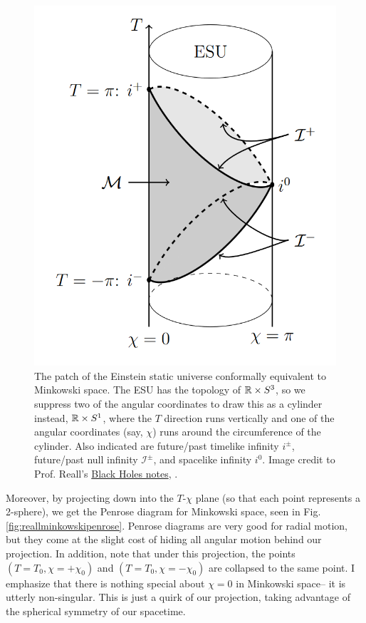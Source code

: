 \begin{figure}
    \centering
    \includegraphics{2019/02/20190222_reallesudiagram.png}
    \caption{The patch of the Einstein static universe conformally equivalent to Minkowski space. The ESU has the topology of $\mathbb{R}\times S^3$, so we suppress two of the angular coordinates to draw this as a cylinder instead, $\mathbb{R}\times S^1$, where the $T$ direction runs vertically and one of the angular coordinates (say, $\chi$) runs around the circumference of the cylinder. Also indicated are future/past timelike infinity $i^\pm$, future/past null infinity $\mathcal{I}^\pm$, and spacelike infinity $i^0$. Image credit to Prof. Reall's  \href{http://www.damtp.cam.ac.uk/user/hsr1000/black_holes_lectures_2016.pdf}{Black Holes notes}, .
    }
    \label{fig:reallesudiagram}
\end{figure}
Moreover, by projecting down into the $T$-$\chi$ plane (so that each point represents a 2-sphere), we get the Penrose diagram for Minkowski space, seen in Fig. \ref{fig:reallminkowskipenrose}. Penrose diagrams are very good for radial motion, but they come at the slight cost of hiding all angular motion behind our projection. In addition, note that under this projection, the points $(T=T_0,\chi=+\chi_0)$ and $(T=T_0,\chi=-\chi_0)$ are collapsed to the same point. I emphasize that there is nothing special about $\chi=0$ in Minkowski space-- it is utterly non-singular. This is just a quirk of our projection, taking advantage of the spherical symmetry of our spacetime.

